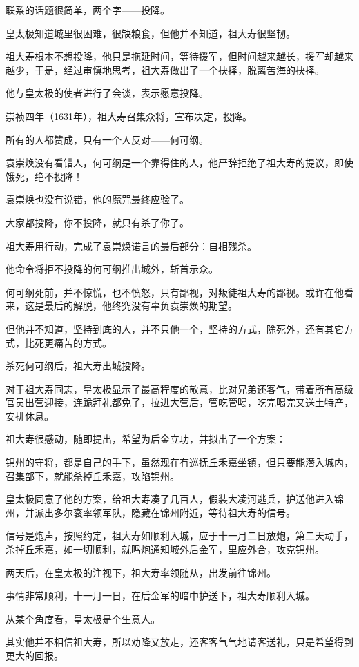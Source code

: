 \begin{multicols}{\theparacolNo}
		联系的话题很简单，两个字——投降。

		皇太极知道城里很困难，很缺粮食，但他并不知道，祖大寿很坚韧。

		祖大寿根本不想投降，他只是拖延时间，等待援军，但时间越来越长，援军却越来越少，于是，经过审慎地思考，祖大寿做出了一个抉择，脱离苦海的抉择。

		他与皇太极的使者进行了会谈，表示愿意投降。

		崇祯四年（1631年），祖大寿召集众将，宣布决定，投降。

		所有的人都赞成，只有一个人反对——何可纲。

		袁崇焕没有看错人，何可纲是一个靠得住的人，他严辞拒绝了祖大寿的提议，即使饿死，绝不投降！

		袁崇焕也没有说错，他的魔咒最终应验了。

		大家都投降，你不投降，就只有杀了你了。

		祖大寿用行动，完成了袁崇焕诺言的最后部分：自相残杀。

		他命令将拒不投降的何可纲推出城外，斩首示众。

		何可纲死前，并不惊慌，也不愤怒，只有鄙视，对叛徒祖大寿的鄙视。或许在他看来，这是最后的解脱，他终究没有辜负袁崇焕的期望。

		但他并不知道，坚持到底的人，并不只他一个，坚持的方式，除死外，还有其它方式，比死更痛苦的方式。

		杀死何可纲后，祖大寿出城投降。

		对于祖大寿同志，皇太极显示了最高程度的敬意，比对兄弟还客气，带着所有高级官员出营迎接，连跪拜礼都免了，拉进大营后，管吃管喝，吃完喝完又送土特产，安排休息。

		祖大寿很感动，随即提出，希望为后金立功，并拟出了一个方案：

		锦州的守将，都是自己的手下，虽然现在有巡抚丘禾嘉坐镇，但只要能潜入城内，召集部下，就能杀掉丘禾嘉，攻陷锦州。

		皇太极同意了他的方案，给祖大寿凑了几百人，假装大凌河逃兵，护送他进入锦州，并派出多尔衮率领军队，隐藏在锦州附近，等待祖大寿的信号。

		信号是炮声，按照约定，祖大寿如顺利入城，应于十一月二日放炮，第二天动手，杀掉丘禾嘉，如一切顺利，就鸣炮通知城外后金军，里应外合，攻克锦州。

		两天后，在皇太极的注视下，祖大寿率领随从，出发前往锦州。

		事情非常顺利，十一月一日，在后金军的暗中护送下，祖大寿顺利入城。

		从某个角度看，皇太极是个生意人。

		其实他并不相信祖大寿，所以劝降又放走，还客客气气地请客送礼，只是希望得到更大的回报。


\end{multicols}
